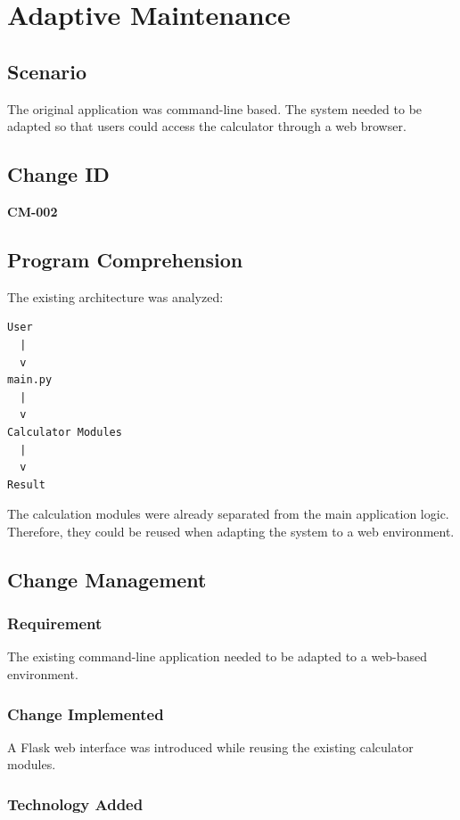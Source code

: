 \documentclass[12pt,a4paper,openany]{report}
\begin{document}
\chapter{Adaptive Maintenance}

\section{Scenario}

The original application was command-line based. The system needed to
be adapted so that users could access the calculator through a web
browser.

\section{Change ID}

\textbf{CM-002}

\section{Program Comprehension}

The existing architecture was analyzed:

\begin{verbatim}
User
  |
  v
main.py
  |
  v
Calculator Modules
  |
  v
Result
\end{verbatim}

The calculation modules were already separated from the main
application logic. Therefore, they could be reused when adapting the
system to a web environment.

\section{Change Management}

\subsection{Requirement}

The existing command-line application needed to be adapted to a
web-based environment.

\subsection{Change Implemented}

A Flask web interface was introduced while reusing the existing
calculator modules.

\subsection{Technology Added}
\end{document}
